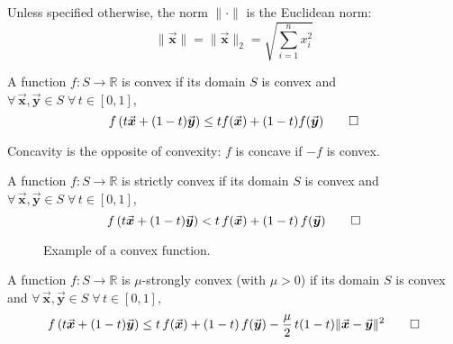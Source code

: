\documentclass[9pt, headings=standardclasses, parskip=half]{scrartcl}
\renewcommand{\emph}[1]{\textcolor{mypurple}{#1}}
\newcommand{\vect}[1]{\vec{\boldsymbol{#1}}}
\begin{document}
Unless specified otherwise, the norm \(\|\cdot\|\) is the Euclidean norm:
\[
\|\vect{x}\|=\|\vect{x}\|_{2}=\sqrt{\sum_{i=1}^{n} x_{i}^{2}} 
\]



\begin{definition}\label{def:convex_function}
A function \(f:S\rightarrow\mathbb{R}\) is \emph{convex} if its domain $S$ is convex and \(\forall\, \vect{x}, \vect{y} \in S\; \forall\, t\in[0,1]\),
\[
f\left(t\vect{x}+(1-t)\vect{y}\right)\leq t f(\vect{x})+(1-t)f(\vect{y})
\qedhere
\]
\end{definition}

Concavity is the opposite of convexity: \(f\) is \emph{concave} if \(-f\) is convex.

\begin{definition}\label{def:strictly_convex_function}
A function \(f:S\rightarrow\mathbb{R}\) is \emph{strictly convex} if its domain $S$ is convex and \(\forall\, \vect{x}, \vect{y} \in S\; \forall\, t\in[0,1]\),
\[
f\left(t\vect{x}+(1-t)\vect{y}\right) < t\,f(\vect{x})+(1-t)\,f(\vect{y})
\qedhere
\]
\end{definition}

\begin{figure}[h]
\centering
{}
\caption*{Example of a convex function.}
\label{fig:convex_fun}
\end{figure}

\begin{definition}\label{def:mu_strongly_convex_function}
A function \(f:S\rightarrow\mathbb{R}\) is \(\mu\)-\emph{strongly convex} (with \(\mu>0\)) if its domain $S$ is convex and \(\forall\, \vect{x}, \vect{y} \in S\; \forall\, t\in[0,1]\),
\[
f\left(t\vect{x}+(1-t)\vect{y}\right) \leq t\,f(\vect{x})+(1-t)\,f(\vect{y}) -\frac{\mu}{2}\,t(1-t)\|\vect{x}-\vect{y}\|^{2}
\qedhere
\]
\end{definition}
\end{document}
